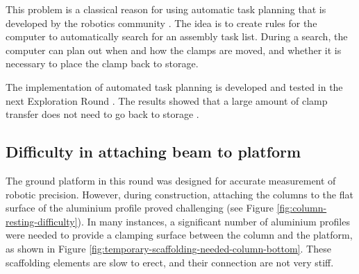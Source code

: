 This problem is a classical reason for using automatic task planning that is developed by the robotics community \parencite{ghallabAutomatedPlanningActing2016}. The idea is to create rules for the computer to automatically search for an assembly task list. During a search, the computer can plan out when and how the clamps are moved, and whether it is necessary to place the clamp back to storage. 

The implementation of automated task planning is developed and tested in the next Exploration Round . The results showed that a large amount of clamp transfer does not need to go back to storage .

\subsection{Difficulty in attaching beam to platform}
\label{subsection:exploration-3-difficulty-in-attaching-beam-to-platform}

The ground platform in this round was designed for accurate measurement of robotic precision. However, during construction, attaching the columns to the flat surface of the aluminium profile proved challenging (see Figure \ref{fig:column-resting-difficulty}). In many instances, a significant number of aluminium profiles were needed to provide a clamping surface between the column and the platform, as shown in Figure \ref{fig:temporary-scaffolding-needed-column-bottom}. These scaffolding elements are slow to erect, and their connection are not very stiff.

